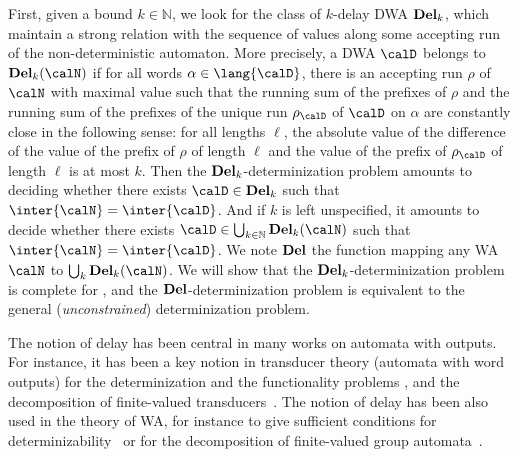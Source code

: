 \documentclass[a4paper]{article}
\begin{document}
First, given a bound $k\in\mathbb{N}$, we look for the class of $k$-delay DWA
${\bf Del}_k$, which maintain a strong relation with the sequence of values
along some accepting run of the non-deterministic automaton. More
precisely, a DWA $\calD$ belongs to ${\bf Del}_k(\calN)$ if for all words $\alpha \in
\lang{\calD}$, there is an accepting run $\rho$ of $\calN$ with maximal value
such that the running sum of the prefixes of $\rho$ and the running sum of the
prefixes of the unique run $\rho_{\calD}$ of $\calD$ on $\alpha$ are constantly
close in the following sense: for all lengths $\ell$, the absolute value of the
difference of the value of the prefix of $\rho$ of length $\ell$ and
the value of the prefix of $\rho_\calD$ of length $\ell$ is at most $k$.
Then the ${\bf
Del}_k$-determinization problem amounts to deciding whether there exists
${\calD} \in {\bf Del}_k$ such that $\inter{\calN}=\inter{\calD}$.  And if $k$
is left unspecified, it amounts to decide whether there exists ${\calD} \in
\bigcup_{k \in {\mathbb{N}}} {\bf Del}_k(\calN)$ such that
$\inter{\calN}=\inter{\calD}$. We note ${\bf Del}$ the function mapping any WA
$\calN$ to $\bigcup_k {\bf Del}_k(\calN)$. We will show that the ${\bf
Del}_k$-determinization problem is  complete for \EXP, and the ${\bf
Del}$-determinization problem is equivalent to the general ({\it unconstrained})
determinization problem.

The notion of delay has been central in many works on automata with
outputs. For instance, it has been a key notion in transducer theory
(automata with word outputs) for the determinization and the
functionality problems \cite{journals/tcs/BealCPS03},  and the decomposition of finite-valued
transducers~\cite{sakarovitch_et_al:LIPIcs:2008:1324}. The notion of delay has been also used in the
theory of WA, for instance to give sufficient conditions for
determinizability~\cite{Mohri_FiniteState_CoLing} or for the decomposition of finite-valued group
automata~\cite{DBLP:conf/fsttcs/FiliotGR14}. 
\end{document}
